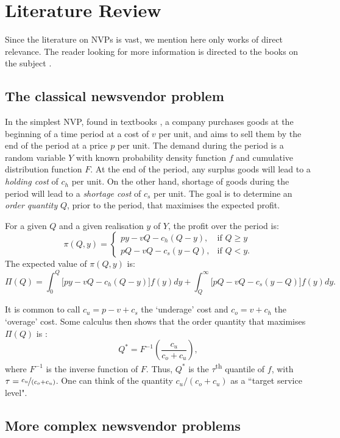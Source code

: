 \documentclass{article}
\begin{document}
\section{Literature Review} \label{se:lit}

Since the literature on NVPs is vast, we mention here only works of direct relevance. The reader looking for more information is directed to the books on the subject \cite{Ch12,Po02,SPP98,Zi00}.

\subsection{The classical newsvendor problem} %

In the simplest NVP, found in textbooks \cite{Ch12}, a company purchases goods at the beginning of a time period at a cost of $v$ per unit, and aims to sell them by the end of the period at a price $p$ per unit. The demand during the period is a random variable $Y$ with known probability density function $f$ and cumulative distribution function $F$. At the end of the period, any surplus goods will lead to a \emph{holding cost} of $c_h$ per unit. On the other hand, shortage of goods during the period will lead to a \emph{shortage cost} of $c_s$ per unit. The goal is to determine an \emph{order quantity} $Q$, prior to the period, that maximises the expected profit.

For a given $Q$ and a given realisation $y$ of $Y$, the profit over the period is:
\[
    \pi(Q,y)=
    \begin{cases}
        py-vQ-c_h(Q-y),& \text{if } Q\geq y\\
        pQ-vQ-c_s(y-Q),& \text{if } Q< y.
    \end{cases}
\]
The expected value of $\pi(Q,y)$ is:
\[
    \Pi(Q) = \int_{0}^{Q} \big[ py-vQ-c_h(Q-y) \big] f(y)dy + \int_{Q}^{\infty} \big[ pQ-vQ-c_s(y-Q) \big] f(y)dy.
\]

It is common to call $c_u= p-v+c_s$ the ‘underage’ cost and $c_o = v+c_h$ the ‘overage’ cost. Some calculus then shows that the order quantity that maximises $\Pi(Q)$ is \cite{Ch12}:
\[
    Q^* = F^{-1}\left( \frac{c_u}{c_o+c_u} \right),
\]
where $F^{-1}$ is the inverse function of $F$. Thus, $Q^*$ is the $\tau$\textsuperscript{th} quantile of $f$, with $\tau=\nicefrac{c_u}{(c_o+c_u)}$. One can think of the quantity
$c_u/(c_o+c_u)$ as a ``target service level".

\subsection{More complex newsvendor problems} %
\end{document}
